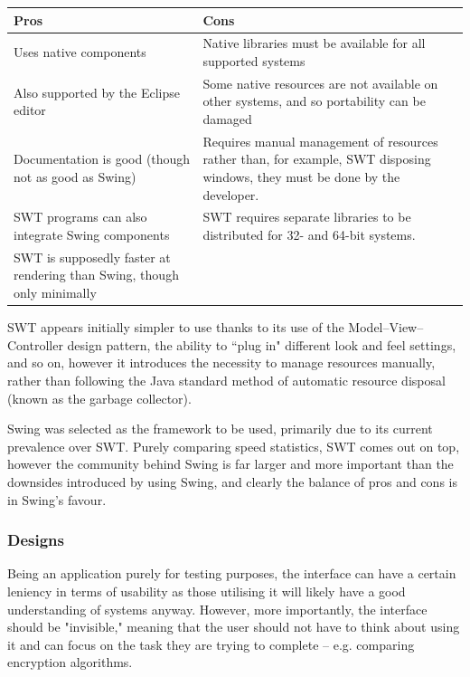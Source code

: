       \begin{center}
       \begin{tabular}{ | p{6cm} | p{6cm} |}
          \hline
          Pros & Cons \\ \hline \hline
          Uses native components & Native libraries must be available for all supported systems \\ \hline
          Also supported by the Eclipse editor & Some native resources are not available on other systems, and so portability can be damaged \\ \hline
          Documentation is good (though not as good as Swing) & Requires manual management of resources rather than, for example, SWT disposing windows, they must be done by the developer. \\ \hline
          SWT programs can also integrate Swing components & SWT requires separate libraries to be distributed for 32- and 64-bit systems. \\ \hline
          SWT is supposedly faster at rendering than Swing, though only minimally & \\
          \hline
        \end{tabular}
      \end{center}
      
      SWT appears initially simpler to use thanks to its use of the Model--View--Controller design pattern, the ability to ``plug in" different look and feel settings, and so on, however it introduces the necessity to manage resources manually, rather than following the Java standard method of automatic resource disposal (known as the garbage collector).
      
      Swing was selected as the framework to be used, primarily due to its current prevalence over SWT. Purely comparing speed statistics, SWT comes out on top, however the community behind Swing is far larger and more important than the downsides introduced by using Swing, and clearly the balance of pros and cons is in Swing's favour.
      
    \subsubsection{Designs}
    
    Being an application purely for testing purposes, the interface can have a certain leniency in terms of usability as those utilising it will likely have a good understanding of systems anyway. However, more importantly, the interface should be "invisible," meaning that the user should not have to think about using it and can focus on the task they are trying to complete -- e.g. comparing encryption algorithms.
    
